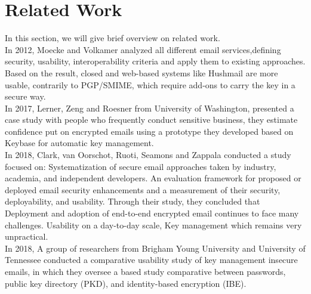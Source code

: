 \section{Related Work}
In this section, we will give brief overview on related work.\\
In 2012, Moecke and Volkamer analyzed all different email services,defining security, usability, interoperability criteria and apply them to existing approaches. Based on the result, closed and web-based systems like Hushmail are more usable, contrarily to PGP/SMIME, which require add-ons to carry the key in a secure way.\\
In 2017, Lerner, Zeng and Roesner from University of Washington, presented a case study with people who frequently conduct sensitive business, they estimate confidence put on encrypted emails using a prototype they developed based on Keybase for automatic key management.\\
In 2018, Clark, van Oorschot, Ruoti, Seamons and Zappala conducted a study focused on: Systematization of secure email approaches taken by industry, academia, and independent developers. An evaluation framework for proposed or deployed email security enhancements and a measurement of their security, deployability, and usability. Through their study, they concluded that Deployment and adoption of end-to-end encrypted email continues to face many challenges. Usability on a day-to-day scale, Key management which remains very unpractical.\\
In 2018, A group of researchers from Brigham Young University and University of Tennessee conducted a comparative usability study of key management insecure emails, in which they oversee a based study comparative between passwords, public key directory (PKD), and identity-based encryption (IBE).


